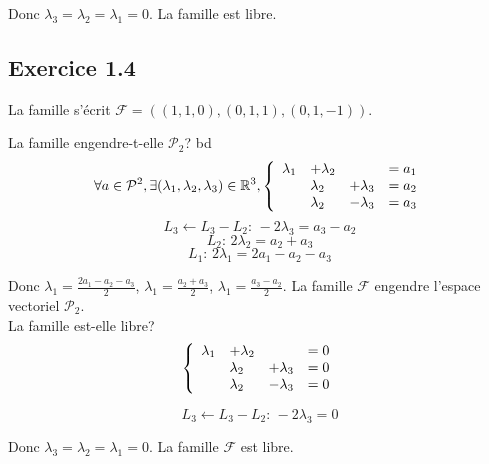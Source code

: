 \documentclass[]{book}
\theoremstyle{definition}
\newcommand{\bb}[1]{\mathbb{#1}}
\newcommand{\R}{\bb{R}}
\begin{document}
Donc $\lambda_3 = \lambda_2 = \lambda_1 = 0$. La famille est libre.

\subsection*{Exercice 1.4}
La famille s'\'ecrit $\mathcal{F} = ((1,1,0),(0,1,1),(0,1,-1))$.

La famille engendre-t-elle $\mathcal{P}_2$?
bd
$$ \forall a \in \mathcal{P}^2, \exists (\lambda_1,\lambda_2,\lambda_3) \in \R^3,
\left\{ 
\begin{array}{l l l l}
  \lambda_1 & +\lambda_2 &               & = a_1 \\
            & \lambda_2  & +\lambda_3   & = a_2 \\
            & \lambda_2  & -\lambda_3   & = a_3 \\
\end{array}
\right. 
$$
$$L_3 \leftarrow L_3-L_2:\, -2\lambda_3 = a_3-a_2$$
$$L_2:\, 2\lambda_2 = a_2+a_3$$
$$L_1:\, 2\lambda_1 = 2a_1-a_2-a_3$$

Donc $\lambda_1 = \frac{2a_1-a_2-a_3}{2}$, $\lambda_1 = \frac{a_2+a_3}{2}$, $\lambda_1 = \frac{a_3-a_2}{2}$. La famille $\mathcal{F}$ engendre l'espace vectoriel $\mathcal{P}_2$.\\

\medskip
La famille est-elle libre?
$$
\left\{ 
\begin{array}{l l l l}
  \lambda_1 & +\lambda_2 &               & = 0 \\
            & \lambda_2  & +\lambda_3   & = 0 \\
            & \lambda_2  & -\lambda_3   & = 0 \\
\end{array}
\right. 
$$

$$L_3 \leftarrow L_3-L_2:\, -2\lambda_3 = 0$$

Donc $\lambda_3 = \lambda_2 = \lambda_1 = 0$. La famille $\mathcal{F}$ est libre.
\end{document}
